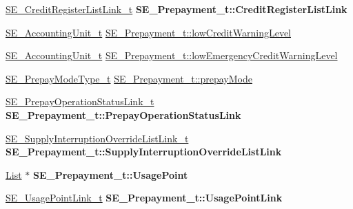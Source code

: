 \begin{DoxyCompactItemize}
\item 
\mbox{\label{group__Prepayment_ga93b7adeaf8589d7084b30d1522e42126}} 
\hyperlink{structSE__CreditRegisterListLink__t}{S\+E\+\_\+\+Credit\+Register\+List\+Link\+\_\+t} {\bfseries S\+E\+\_\+\+Prepayment\+\_\+t\+::\+Credit\+Register\+List\+Link}
\item 
\hyperlink{structSE__AccountingUnit__t}{S\+E\+\_\+\+Accounting\+Unit\+\_\+t} \hyperlink{group__Prepayment_ga1b2d199f5e15d28b29cd33d216328ef0}{S\+E\+\_\+\+Prepayment\+\_\+t\+::low\+Credit\+Warning\+Level}
\item 
\hyperlink{structSE__AccountingUnit__t}{S\+E\+\_\+\+Accounting\+Unit\+\_\+t} \hyperlink{group__Prepayment_gae5fc43fad2c5429a124db67195f94acb}{S\+E\+\_\+\+Prepayment\+\_\+t\+::low\+Emergency\+Credit\+Warning\+Level}
\item 
\hyperlink{group__PrepayModeType_gad5775ab7dde98ccb92880e85b9a905b7}{S\+E\+\_\+\+Prepay\+Mode\+Type\+\_\+t} \hyperlink{group__Prepayment_gaa405ffaa7f1ebe0ebdaf55b747dcf629}{S\+E\+\_\+\+Prepayment\+\_\+t\+::prepay\+Mode}
\item 
\mbox{\label{group__Prepayment_ga69662228676548dcf84a7ea10d4efe47}} 
\hyperlink{structSE__PrepayOperationStatusLink__t}{S\+E\+\_\+\+Prepay\+Operation\+Status\+Link\+\_\+t} {\bfseries S\+E\+\_\+\+Prepayment\+\_\+t\+::\+Prepay\+Operation\+Status\+Link}
\item 
\mbox{\label{group__Prepayment_ga7d5f8099d86bf03cc2cb141e8604432a}} 
\hyperlink{structSE__SupplyInterruptionOverrideListLink__t}{S\+E\+\_\+\+Supply\+Interruption\+Override\+List\+Link\+\_\+t} {\bfseries S\+E\+\_\+\+Prepayment\+\_\+t\+::\+Supply\+Interruption\+Override\+List\+Link}
\item 
\mbox{\label{group__Prepayment_ga232e285e7b409d860d338b712745db5c}} 
\hyperlink{structList}{List} $\ast$ {\bfseries S\+E\+\_\+\+Prepayment\+\_\+t\+::\+Usage\+Point}
\item 
\mbox{\label{group__Prepayment_ga1446ada3e207d5ec89f097c431a1acd8}} 
\hyperlink{structSE__UsagePointLink__t}{S\+E\+\_\+\+Usage\+Point\+Link\+\_\+t} {\bfseries S\+E\+\_\+\+Prepayment\+\_\+t\+::\+Usage\+Point\+Link}
\end{DoxyCompactItemize}


